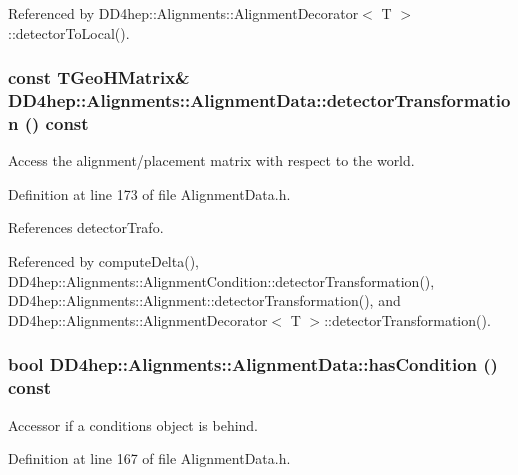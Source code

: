 Referenced by DD4hep::Alignments::AlignmentDecorator$<$ T $>$::detectorToLocal().\hypertarget{class_d_d4hep_1_1_alignments_1_1_alignment_data_a7a47470d3b311ac1eab5acd888718dbf}{
\subsubsection[{detectorTransformation}]{\setlength{\rightskip}{0pt plus 5cm}const TGeoHMatrix\& DD4hep::Alignments::AlignmentData::detectorTransformation () const}}
\label{class_d_d4hep_1_1_alignments_1_1_alignment_data_a7a47470d3b311ac1eab5acd888718dbf}


Access the alignment/placement matrix with respect to the world. 

Definition at line 173 of file AlignmentData.h.

References detectorTrafo.

Referenced by computeDelta(), DD4hep::Alignments::AlignmentCondition::detectorTransformation(), DD4hep::Alignments::Alignment::detectorTransformation(), and DD4hep::Alignments::AlignmentDecorator$<$ T $>$::detectorTransformation().\hypertarget{class_d_d4hep_1_1_alignments_1_1_alignment_data_a4ce9a61003981e6c9d39517eda97c5eb}{
\subsubsection[{hasCondition}]{\setlength{\rightskip}{0pt plus 5cm}bool DD4hep::Alignments::AlignmentData::hasCondition () const}}
\label{class_d_d4hep_1_1_alignments_1_1_alignment_data_a4ce9a61003981e6c9d39517eda97c5eb}


Accessor if a conditions object is behind. 

Definition at line 167 of file AlignmentData.h.

